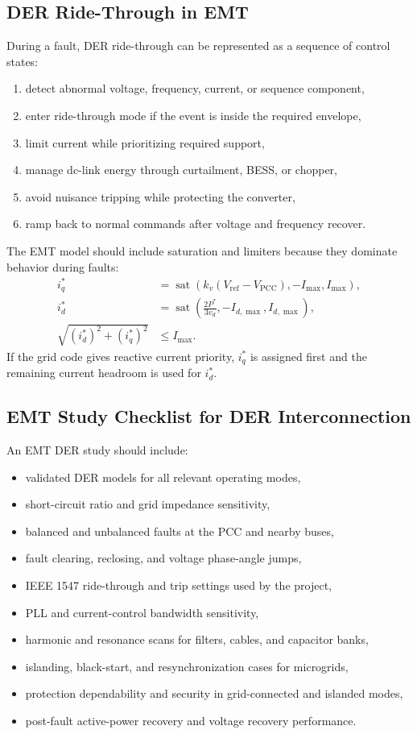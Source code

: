 \documentclass[11pt]{article}
\begin{document}
\subsection{DER Ride-Through in EMT}
During a fault, DER ride-through can be represented as a sequence of control
states:
\begin{enumerate}
  \item detect abnormal voltage, frequency, current, or sequence component,
  \item enter ride-through mode if the event is inside the required envelope,
  \item limit current while prioritizing required support,
  \item manage dc-link energy through curtailment, BESS, or chopper,
  \item avoid nuisance tripping while protecting the converter,
  \item ramp back to normal commands after voltage and frequency recover.
\end{enumerate}
The EMT model should include saturation and limiters because they dominate
behavior during faults:
\begin{align}
i_q^*&=\operatorname{sat}\left(k_v(V_{\mathrm{ref}}-V_{\mathrm{PCC}}),
-I_{\max},I_{\max}\right),\\
i_d^*&=\operatorname{sat}\left(\frac{2P^*}{3v_d},-I_{d,\max},I_{d,\max}\right),\\
\sqrt{(i_d^*)^2+(i_q^*)^2}&\le I_{\max}.
\end{align}
If the grid code gives reactive current priority, $i_q^*$ is assigned first and
the remaining current headroom is used for $i_d^*$.

\subsection{EMT Study Checklist for DER Interconnection}
An EMT DER study should include:
\begin{itemize}
  \item validated DER models for all relevant operating modes,
  \item short-circuit ratio and grid impedance sensitivity,
  \item balanced and unbalanced faults at the PCC and nearby buses,
  \item fault clearing, reclosing, and voltage phase-angle jumps,
  \item IEEE 1547 ride-through and trip settings used by the project,
  \item PLL and current-control bandwidth sensitivity,
  \item harmonic and resonance scans for filters, cables, and capacitor banks,
  \item islanding, black-start, and resynchronization cases for microgrids,
  \item protection dependability and security in grid-connected and islanded modes,
  \item post-fault active-power recovery and voltage recovery performance.
\end{itemize}
\end{document}
